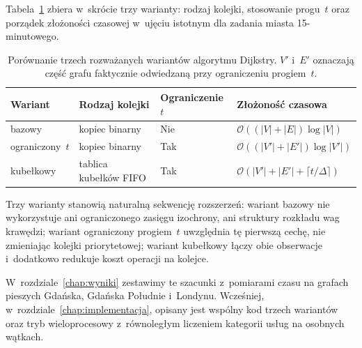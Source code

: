 Tabela~\ref{tab:warianty_porownanie} zbiera w~skrócie trzy warianty: rodzaj
kolejki, stosowanie progu~$t$ oraz porządek złożoności czasowej w~ujęciu
istotnym dla zadania miasta 15-minutowego.

\begin{table}[ht]
\centering
\caption{Porównanie trzech rozważanych wariantów algorytmu Dijkstry.
$V'$ i~$E'$ oznaczają część grafu faktycznie odwiedzaną przy ograniczeniu
progiem~$t$.}
\label{tab:warianty_porownanie}
\begin{tabular}{l l l l}
\hline
\textbf{Wariant} & \textbf{Rodzaj kolejki} & \textbf{Ograniczenie $t$} & \textbf{Złożoność czasowa} \\
\hline
bazowy           & kopiec binarny    & Nie & $\mathcal{O}((|V|+|E|)\log|V|)$            \\
ograniczony~$t$  & kopiec binarny    & Tak          & $\mathcal{O}((|V'|+|E'|)\log|V'|)$         \\
kubełkowy        & tablica kubełków FIFO    & Tak          & $\mathcal{O}(|V'|+|E'|+\lceil t/\Delta\rceil)$ \\
\hline
\end{tabular}
\end{table}

Trzy warianty stanowią naturalną sekwencję rozszerzeń: wariant bazowy nie
wykorzystuje ani ograniczonego zasięgu izochrony, ani struktury rozkładu
wag krawędzi; wariant ograniczony progiem~$t$ uwzględnia tę pierwszą cechę,
nie zmieniając kolejki priorytetowej; wariant kubełkowy łączy obie obserwacje
i~dodatkowo redukuje koszt operacji na kolejce.

W~rozdziale~\ref{chap:wyniki} zestawimy te szacunki z~pomiarami czasu na
grafach pieszych Gdańska, Gdańska Południe i~Londynu. Wcześniej,
w~rozdziale~\ref{chap:implementacja}, opisany jest wspólny kod trzech wariantów
oraz tryb wieloprocesowy z~równoległym liczeniem kategorii usług na osobnych
wątkach.
